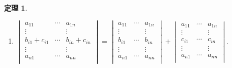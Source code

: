 \documentclass[dvipdfmx,a4paper,11pt]{article}
\theoremstyle{definition}
\newtheorem{thm}{定理}
\begin{document}
\begin{tcolorbox}[
    colback = white,
    colframe = green!35!black,
    fonttitle = \bfseries,
    breakable = true]
\begin{thm}
\begin{enumerate}
\item  
$
\begin{vmatrix}
a_{11}&  \cdots &a_{1n} \\
\vdots&	 	  &	\vdots \\
b_{i1} + c_{i1} & \cdots &b_{in} + c_{in} \\
\vdots& 		   &	\vdots \\
a_{n1}	& \cdots &a_{nn} \\
\end{vmatrix}
=
\begin{vmatrix}
a_{11}&  \cdots &a_{1n} \\
\vdots&	 	  &	\vdots \\
b_{i1}  & \cdots &b_{in}  \\
\vdots& 		   &	\vdots \\
a_{n1}	& \cdots &a_{nn} \\
\end{vmatrix}
+
\begin{vmatrix}
a_{11}&  \cdots &a_{1n} \\
\vdots&	 	  &	\vdots \\
c_{i1} & \cdots & c_{in} \\
\vdots& 		   &	\vdots \\
a_{n1}	& \cdots &a_{nn} \\
\end{vmatrix}
$.

\end{enumerate}
  \end{thm}
 \end{tcolorbox}
\end{document}

